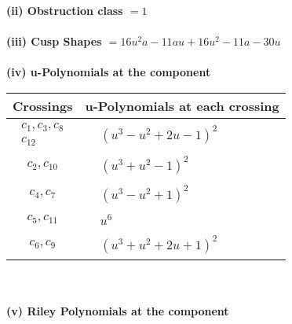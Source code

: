 \documentclass[1p]{elsarticle_modified}
\theoremstyle{definition}
\begin{document}
\flushleft \textbf{(ii) Obstruction class $= 1$}\\~\\
\flushleft \textbf{(iii) Cusp Shapes $= 16 u^2 a-11 a u+16 u^2-11 a-30 u$}\\~\\
\newpage\renewcommand{\arraystretch}{1}
\flushleft \textbf{(iv) u-Polynomials at the component}\newline \\
\begin{tabular}{m{50pt}|m{274pt}}
Crossings & \hspace{64pt}u-Polynomials at each crossing \\
\hline $$\begin{aligned}c_{1},c_{3},c_{8}\\c_{12}\end{aligned}$$&$\begin{aligned}
&(u^3- u^2+2 u-1)^2
\end{aligned}$\\
\hline $$\begin{aligned}c_{2},c_{10}\end{aligned}$$&$\begin{aligned}
&(u^3+u^2-1)^2
\end{aligned}$\\
\hline $$\begin{aligned}c_{4},c_{7}\end{aligned}$$&$\begin{aligned}
&(u^3- u^2+1)^2
\end{aligned}$\\
\hline $$\begin{aligned}c_{5},c_{11}\end{aligned}$$&$\begin{aligned}
&u^6
\end{aligned}$\\
\hline $$\begin{aligned}c_{6},c_{9}\end{aligned}$$&$\begin{aligned}
&(u^3+u^2+2 u+1)^2
\end{aligned}$\\
\hline
\end{tabular}\\~\\
\newpage\renewcommand{\arraystretch}{1}
\flushleft \textbf{(v) Riley Polynomials at the component}\newline \\
\end{document}

